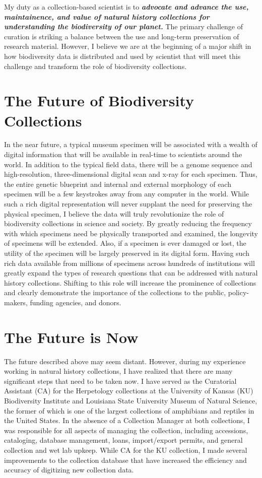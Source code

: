 \documentclass[10pt]{article}
\begin{document}
\raggedright
\singlespacing

My duty as a collection-based scientist is to \textbf{\textit{advocate and
advance the use, maintainence, and value of natural history collections for
understanding the biodiversity of our planet.}}
The primary challenge of curation is striking a balance between the use and
long-term preservation of research material.
However, I believe we are at the beginning of a major shift in how biodiversity
data is distributed and used by scientist that will meet this challenge and
transform the role of biodiversity collections.

\section*{The Future of Biodiversity Collections}
In the near future, a typical museum specimen will be associated
with a wealth of digital information that will be available in real-time
to scientists around the world.
In addition to the typical field data, there will be a genome sequence
and high-resolution, three-dimensional digital scan and x-ray for each
specimen.
Thus, the entire genetic blueprint and internal and external morphology of 
each specimen will be a few keystrokes away from any computer in the world.
While such a rich digital representation will never supplant the need for
preserving the physical specimen, I believe the data will truly revolutionize
the role of biodiversity collections in science and society.
By greatly reducing the frequency with which specimens need be physically
transported and examined, the longevity of specimens will be extended.
Also, if a specimen is ever damaged or lost, the utility of the specimen will
be largely preserved in its digital form.
Having such rich data available from millions of specimens across hundreds of
institutions will greatly expand the types of research questions that can be
addressed with natural history collections.
Shifting to this role will increase the prominence of collections and clearly
demonstrate the importance of the collections to the public, policy-makers,
funding agencies, and donors.

\section*{The Future is Now}
The future described above may seem distant.
However, during my experience working in natural history collections, I have
realized that there are many significant steps that need to be taken now.
I have served as the Curatorial Assistant (CA) for the Herpetology collections
at the University of Kansas (KU) Biodiversity Institute and Louisiana State
University Museum of Natural Science, the former of which is one of the largest
collections of amphibians and reptiles in the United States.
In the absence of a Collection Manager at both collections, I was responsible
for all aspects of managing the collection, including accessions, cataloging,
database management, loans, import/export permits, and general collection and
wet lab upkeep.
While CA for the KU collection, I made several improvements to the collection
database that have increased the efficiency and accuracy of digitizing
new collection data.
\end{document}
